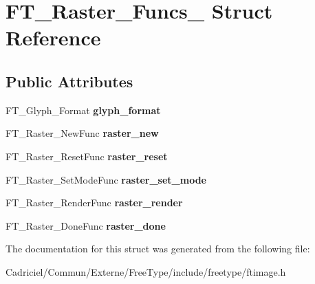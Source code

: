 \hypertarget{struct_f_t___raster___funcs__}{}\section{F\+T\+\_\+\+Raster\+\_\+\+Funcs\+\_\+ Struct Reference}
\label{struct_f_t___raster___funcs__}
\subsection*{Public Attributes}
\begin{DoxyCompactItemize}
\item 
F\+T\+\_\+\+Glyph\+\_\+\+Format {\bfseries glyph\+\_\+format}\hypertarget{struct_f_t___raster___funcs___a741b43afa16f1f1b7f633cebd9f1d6a9}{}\label{struct_f_t___raster___funcs___a741b43afa16f1f1b7f633cebd9f1d6a9}

\item 
F\+T\+\_\+\+Raster\+\_\+\+New\+Func {\bfseries raster\+\_\+new}\hypertarget{struct_f_t___raster___funcs___a31c9df9af6636df8a17a11bcd921b6a4}{}\label{struct_f_t___raster___funcs___a31c9df9af6636df8a17a11bcd921b6a4}

\item 
F\+T\+\_\+\+Raster\+\_\+\+Reset\+Func {\bfseries raster\+\_\+reset}\hypertarget{struct_f_t___raster___funcs___a91e9decd6066090a5f306f33f9815d39}{}\label{struct_f_t___raster___funcs___a91e9decd6066090a5f306f33f9815d39}

\item 
F\+T\+\_\+\+Raster\+\_\+\+Set\+Mode\+Func {\bfseries raster\+\_\+set\+\_\+mode}\hypertarget{struct_f_t___raster___funcs___a3b37c781e54cf933cb60f57f2d45b32c}{}\label{struct_f_t___raster___funcs___a3b37c781e54cf933cb60f57f2d45b32c}

\item 
F\+T\+\_\+\+Raster\+\_\+\+Render\+Func {\bfseries raster\+\_\+render}\hypertarget{struct_f_t___raster___funcs___a7479a3def4522ce2667d6772e7bb96a5}{}\label{struct_f_t___raster___funcs___a7479a3def4522ce2667d6772e7bb96a5}

\item 
F\+T\+\_\+\+Raster\+\_\+\+Done\+Func {\bfseries raster\+\_\+done}\hypertarget{struct_f_t___raster___funcs___aecfd50bb6567d4442c997467cd68c857}{}\label{struct_f_t___raster___funcs___aecfd50bb6567d4442c997467cd68c857}

\end{DoxyCompactItemize}


The documentation for this struct was generated from the following file\+:\begin{DoxyCompactItemize}
\item 
Cadriciel/\+Commun/\+Externe/\+Free\+Type/include/freetype/ftimage.\+h\end{DoxyCompactItemize}
